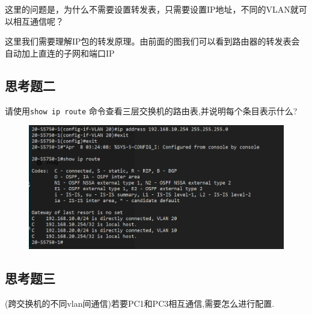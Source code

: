 \documentclass{myreport}
\begin{document}
这里的问题是，为什么不需要设置转发表，只需要设置IP地址，不同的VLAN就可以相互通信呢？

这里我们需要理解IP包的转发原理。由前面的图我们可以看到路由器的转发表会自动加上直连的子网和端口IP

\subsection{思考题二}

\begin{tcolorbox}[title = {思考题二}]
请使用\texttt{show ip route} 命令查看三层交换机的路由表,并说明每个条目表示什么?
\end{tcolorbox}


\begin{figure}[htp]
    \centering
    \includegraphics[width=13cm]{"./figure/2018-05-17-17-26-19.png"}
    \caption{}
    \label{fig:}
\end{figure}




\subsection{思考题三}

\begin{tcolorbox}[title = {思考题三}]
(跨交换机的不同vlan间通信)若要PC1和PC3相互通信,需要怎么进行配置.
\end{tcolorbox}
\end{document}
